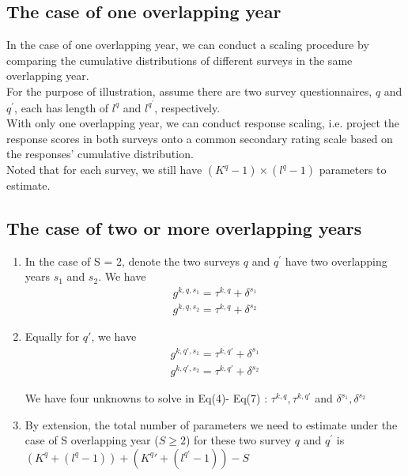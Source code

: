 \documentclass{article}
\begin{document}
\subsection{The case of one overlapping year}
In the case of one overlapping year, we can conduct a scaling procedure by comparing the cumulative distributions of different surveys in the same overlapping year.  \\

For the purpose of illustration, assume there are two survey questionnaires, $q$ and $q^'$, each has length of $l^q$ and $l^q^'$, respectively. \\

With only one overlapping year, we can conduct response scaling, i.e. project the response scores in both surveys onto a common secondary rating scale based on the responses’ cumulative distribution. \\

Noted that for each survey,  we still have  $(K^q-1)\times (l^q-1)$ parameters to estimate. \\


\subsection{The case of two or more overlapping years}

  \begin{enumerate}
      \item In the case of S = 2, denote the two surveys $q$ and $q^'$ have two overlapping years $s_1$ and $s_2$. We have  
    \begin{align}\label{eq4}
        g^{k,q,s_1} =  \tau^{k,q}  + \delta^{s_1}   \\
        g^{k,q,s_2} =  \tau^{k,q} +  \delta^{s_2}
    \end{align}
     
     \item  
     Equally for $q'$, we  have 
     \begin{align}\label{eq4}
        g^{k,q',s_1} =  \tau^{k,q'}  + \delta^{s_1}   \\
        g^{k,q',s_2} =  \tau^{k,q'} +  \delta^{s_2}
    \end{align}
    

 We have four unknowns to solve in  Eq(4)- Eq(7) : $\tau^{k,q},\tau^{k,q'}$ and $\delta^{s_1},\delta^{s_2} $ 
 

      \item By extension, the total number of parameters we need to estimate under the case of S overlapping year ($S \geq	 2 $) for these two survey  $q$ and $q^'$ is  $ (K^q+(l^q - 1)) + (K^q'+(l^{q'} -1)) -S $
  \end{enumerate}
  
\end{document}
